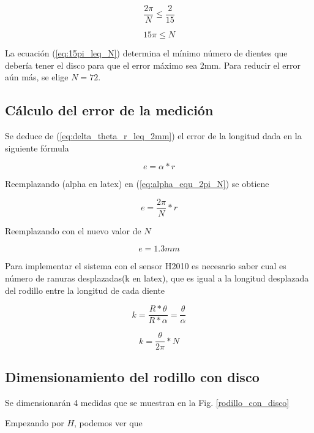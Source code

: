 \documentclass[main_conf.tex]{subfiles}
\begin{document}
\begin{equation}
\frac{2\pi}{N}\leq \frac{2}{15}
\end{equation}

\begin{equation}
\label{eq:15pi_leq_N}
15\pi \leq N
\end{equation}

La ecuación (\ref{eq:15pi_leq_N}) determina el mínimo número de
dientes que debería tener el disco para que el error máximo sea
2mm. Para reducir el error aún más, se elige $N=72$.

\subsection{Cálculo del error de la medición}

Se deduce de (\ref{eq:delta_theta_r_leq_2mm}) el error de la
longitud dada en la siguiente fórmula

\begin{equation}
e=\alpha*r
\end{equation}

Reemplazando (alpha en latex) en (\ref{eq:alpha_equ_2pi_N}) se
obtiene

\begin{equation}
e=\frac{2\pi}{N}*r
\end{equation}

Reemplazando con el nuevo valor de $N$

\begin{equation}
e = 1.3mm
\end{equation}

Para implementar el sistema con el sensor H2010 es necesario saber
cual es número de ranuras desplazadas(k en latex), que es igual a
la longitud desplazada del rodillo entre la longitud de cada diente

\begin{equation}
k=\frac{R*\theta}{R*\alpha}=\frac{\theta}{\alpha}
\end{equation}

\begin{equation}
k = \frac{\theta}{2\pi}*N
\end{equation}

\subsection{Dimensionamiento del rodillo con disco}
Se dimensionarán 4 medidas que se muestran en la Fig.
\ref{rodillo_con_disco}

Empezando por $H$, podemos ver que
\end{document}
